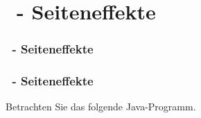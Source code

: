 \def\stitle{\theexercise\ - Seiteneffekte}
\section{\stitle}
\begin{frame}
  \frametitle{\stitle}%
\tableofcontents[current]
\end{frame}

\begin{frame}[t]%
    \frametitle{\stitle}

Betrachten Sie das folgende Java-Programm.
  

\end{frame}
